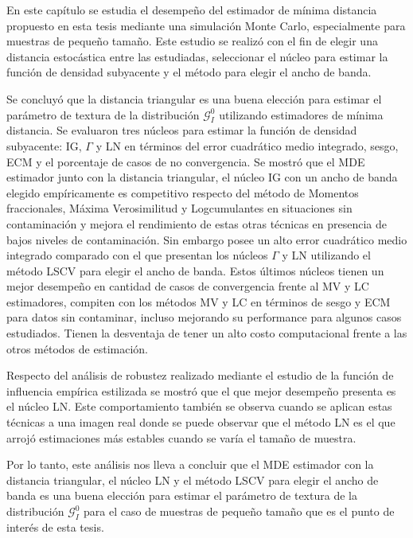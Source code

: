 En este capítulo se estudia el desempeño del estimador de mínima distancia propuesto en esta tesis mediante una simulación Monte Carlo, especialmente para muestras de pequeño tamaño. Este estudio se realizó con el fin de elegir una distancia estocástica entre las estudiadas, seleccionar el núcleo para estimar la función de densidad subyacente y el método para elegir el ancho de banda.

Se concluyó que la distancia triangular es una buena elección para estimar el parámetro de textura de la distribución $\mathcal{G}_I^0$ utilizando estimadores de mínima distancia. Se evaluaron tres núcleos para estimar la función de densidad subyacente: IG, $\Gamma$ y LN en términos del error cuadrático medio integrado, sesgo, ECM y el porcentaje de casos de no convergencia. Se mostró que el MDE estimador junto con la distancia triangular, el núcleo IG con un ancho de banda elegido empíricamente es competitivo respecto del método de Momentos fraccionales, Máxima Verosimilitud y Logcumulantes en situaciones sin contaminación y mejora el rendimiento de estas otras técnicas en presencia de bajos niveles de contaminación. Sin embargo posee un alto error cuadrático medio integrado comparado con el que presentan los núcleos $\Gamma$ y LN utilizando el método LSCV para elegir el ancho de banda. Estos últimos núcleos tienen un mejor desempeño en cantidad de casos de convergencia frente al MV y LC estimadores, compiten con los métodos MV y LC en términos de sesgo y ECM para datos sin contaminar, incluso mejorando su performance para algunos casos estudiados. Tienen la desventaja de tener un alto costo computacional frente a las otros métodos de estimación.

Respecto del análisis de robustez realizado mediante el estudio de la función de influencia empírica estilizada se mostró que el que mejor desempeño presenta es el núcleo LN. Este comportamiento también se observa cuando se aplican estas técnicas a una imagen real donde se puede observar que el método LN es el que arrojó estimaciones más estables cuando se varía el tamaño de muestra.

 Por lo tanto, este análisis nos lleva a concluir que el MDE estimador con la distancia triangular, el núcleo LN y el método LSCV para elegir el ancho de banda es una buena elección para estimar el parámetro de textura de la distribución $\mathcal{G}_I^0$ para el caso de muestras de pequeño tamaño que es el punto de interés de esta tesis.

